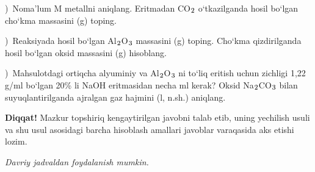 \documentclass[11pt,a4paper]{article}
\renewcommand{\textsubscript}[1]{\ensuremath{_{\text{\fontsize{8}{8}\selectfont #1}}}}
\newcommand{\qsep}{\par\vspace{13pt}}
\newcommand{\diqqat}[1]{\par\smallskip\noindent\textbf{Diqqat!} #1\par\medskip}
\newcommand{\hdrpill}[1]{\begin{tikzpicture}[baseline=0pt]\node[fill=ygreen,text=white,rounded corners=8pt,inner xsep=10pt,inner ysep=5pt,font=\fontsize{13}{15}\bfseries\selectfont] at (0,0.475){#1};\end{tikzpicture}}
\newcommand{\curvar}{}\fancyhead[R]{\hdrpill{\curvar}}
\begin{document}
)\ Noma'lum M metallni aniqlang. Eritmadan CO\textsubscript{2} o`tkazilganda hosil bo`lgan cho`kma massasini (g) toping.\par
{})\ Reaksiyada hosil bo`lgan Al\textsubscript{2}O\textsubscript{3} massasini (g) toping. Cho`kma qizdirilganda hosil bo`lgan oksid massasini (g) hisoblang.\par
{})\ Mahsulotdagi ortiqcha alyuminiy va Al\textsubscript{2}O\textsubscript{3} ni to`liq eritish uchun zichligi 1,22 g/ml bo`lgan 20\% li NaOH eritmasidan necha ml kerak? Oksid Na\textsubscript{2}CO\textsubscript{3} bilan suyuqlantirilganda ajralgan gaz hajmini (l, n.sh.) aniqlang.\par
\diqqat{Mazkur topshiriq kengaytirilgan javobni talab etib, uning yechilish usuli va shu usul asosidagi barcha hisoblash amallari javoblar varaqasida aks etishi lozim.}\qsep
\newpage
\renewcommand{\curvar}{17-variant}
\thispagestyle{first}
\noindent\textit{Davriy jadvaldan foydalanish mumkin.}
\par\smallskip
\end{document}
